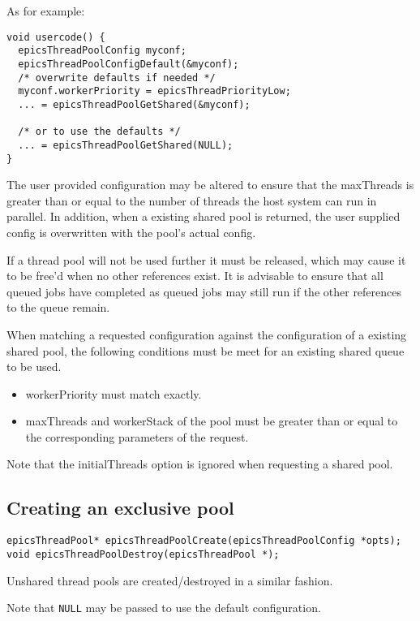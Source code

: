 As for example:

\begin{verbatim}
void usercode() {
  epicsThreadPoolConfig myconf;
  epicsThreadPoolConfigDefault(&myconf);
  /* overwrite defaults if needed */
  myconf.workerPriority = epicsThreadPriorityLow;
  ... = epicsThreadPoolGetShared(&myconf);

  /* or to use the defaults */
  ... = epicsThreadPoolGetShared(NULL);
}
\end{verbatim}

The user provided configuration may be altered to ensure that the
maxThreads is greater than or equal to the number of threads the host
system can run in parallel. In addition, when a existing shared pool
is returned, the user supplied config is overwritten with the pool's
actual config.

If a thread pool will not be used further it must be released, which
may cause it to be free'd when no other references exist.
It is advisable to ensure that all queued
jobs have completed as queued jobs may still run if the other references
to the queue remain.

When matching a requested configuration against the configuration
of a existing shared pool, the following conditions must be meet
for an existing shared queue to be used.
\begin{itemize}
\item workerPriority must match exactly.
\item maxThreads and workerStack of the pool must be greater than or equal
to the corresponding parameters of the request.
\end{itemize}

Note that the initialThreads option is ignored when requesting a shared pool.

\subsection{Creating an exclusive pool}

\begin{verbatim}
epicsThreadPool* epicsThreadPoolCreate(epicsThreadPoolConfig *opts);
void epicsThreadPoolDestroy(epicsThreadPool *);
\end{verbatim}



Unshared thread pools are created/destroyed in a similar fashion.

Note that \verb|NULL| may be passed to use the default configuration.

